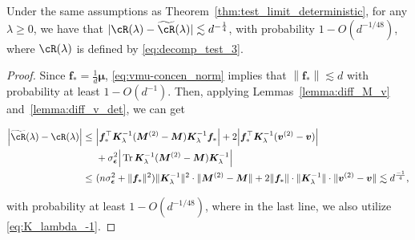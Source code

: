 \documentclass[twoside,11pt]{article}
\newcommand{\norm}[1]{\left\|#1\right\|}
\newcommand{\bepsilon}{\boldsymbol{\epsilon}}
\def\vf{{\boldsymbol f}}
\def\bK{{\boldsymbol K}}
\def\bM{{\boldsymbol M}}
\def\bv{{\boldsymbol v}}
\renewcommand{\bK}{\boldsymbol{K}}
\newcommand{\Tr}{\operatorname{Tr}}
\newcommand{\vmu}{\mbi{\mu}}
\newcommand{\1}{\mathbf{1}}
\def\mbi#1{\boldsymbol{#1}}
\def\mbi#1{\boldsymbol{#1}} %
\begin{document}
\begin{lemma}\label{lemma:diff_R_Rtilde_det}
 Under the same assumptions as Theorem~\ref{thm:test_limit_deterministic}, for any $\lambda\ge 0$, we have that
   $ | \cR(\lambda)-\widetilde\cR(\lambda)|\lesssim d^{{-}\frac{1}{4}}$,
with probability  $1-O(d^{-1/48})$,  where $\cR(\lambda)$ is defined by \eqref{eq:decomp_test_3}.
\end{lemma}
\begin{proof}
Since $\vf_*=\frac{1}{d}\vmu$, \eqref{eq:vmu-concen_norm} implies that $\norm{\vf_*}\lesssim d$ with probability at least $1-O(d^{-1})$. Then, applying Lemmas~\ref{lemma:diff_M_v} and~\ref{lemma:diff_v_det}, we can get
\begin{small}
\begin{align}
    \Big|\widetilde\cR(\lambda)- \cR(\lambda)\Big|\le~& \Big|\vf_*^\top \bK_{\lambda}^{-1}(\bM^{(2)}-\bM)\bK_{\lambda}^{-1} \vf_* \Big|
    +2\Big|\vf_*^\top\bK_{\lambda}^{-1}(\bv^{(2)}-\bv)\Big|\\
    ~& +\sigma^2_{\bepsilon}\Big|\Tr\bK_{\lambda}^{-1}(\bM^{(2)}-\bM)\bK_{\lambda}^{-1}\Big|\\
    \le ~& (n\sigma^2_{\bepsilon}+\|\vf_*\|^2)\|\bK_{\lambda}^{-1}\|^2\cdot \|\bM^{(2)}-\bM\|+2\|\vf_*\|\cdot\|\bK_{\lambda}^{-1}\| \cdot \|\bv^{(2)}-\bv\|  
    \lesssim  d^{\frac{-1}{4}},
\end{align}
\end{small}
with probability at least $1-O(d^{-1/48})$, where in the last line, we also utilize \eqref{eq:K_lambda_-1}.
\end{proof}
\end{document}
